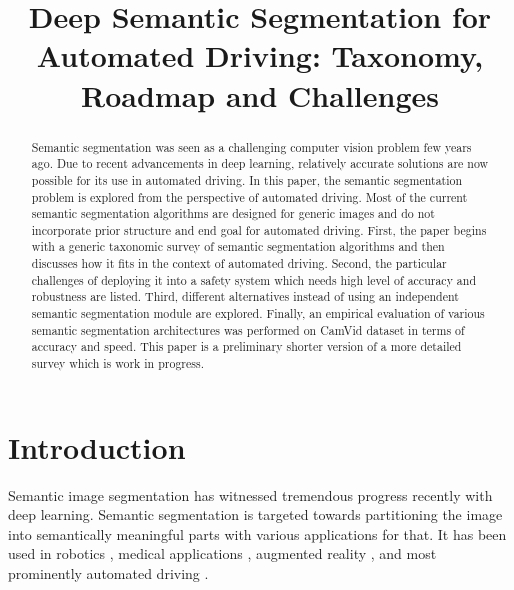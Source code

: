 \documentclass[conference]{IEEEtran}
\begin{document}
\title{Deep Semantic Segmentation for Automated Driving: Taxonomy, Roadmap and Challenges}



\author{

\and



}










\maketitle

\IEEEpeerreviewmaketitle



\begin{abstract}
Semantic segmentation was seen as a challenging computer vision problem few years ago. Due to recent advancements in deep learning, relatively accurate solutions are now possible for its use in automated driving. In this paper, the semantic segmentation problem is explored from the perspective of automated driving. Most of the current semantic segmentation algorithms are designed for generic images and do not incorporate prior structure and end goal for automated driving. First, the paper begins with a generic taxonomic survey of semantic segmentation algorithms and then discusses how it fits in the context of automated driving. Second, the particular challenges of deploying it into a safety system which needs high level of accuracy and robustness are listed. Third, different alternatives instead of using an independent semantic segmentation module are explored. Finally, an empirical evaluation of various semantic segmentation architectures was performed on CamVid dataset in terms of accuracy and speed. This paper is a preliminary shorter version of a more detailed survey which is work in progress.
\end{abstract}

\section{Introduction}
\label{sec:introduction}
Semantic image segmentation has witnessed tremendous progress recently with deep learning. Semantic segmentation is targeted towards partitioning the image into semantically meaningful parts with various applications for that. It has been used in robotics \cite{valada2016deep}\cite{bonanni2013human}\cite{vineet2015icra}\cite{kundu2014joint}, medical applications \cite{cciccek20163d}\cite{zhu2016adversarial}, augmented reality \cite{miksik2015semantic}, and most prominently automated driving \cite{zhang2013understanding}\cite{ros2016synthia}\cite{brostow2009semantic}\cite{cordts2016cityscapes}. 
\end{document}
